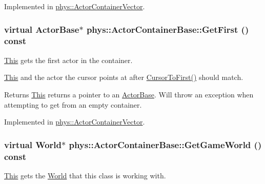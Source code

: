 Implemented in \hyperlink{classphys_1_1ActorContainerVector_ae18c29b30d840e0f4fc9b553dd5ca32c}{phys::ActorContainerVector}.

\hypertarget{classphys_1_1ActorContainerBase_ae703482d84a9c6726e28a8f26418b161}{
\subsubsection[{GetFirst}]{\setlength{\rightskip}{0pt plus 5cm}virtual {\bf ActorBase}$\ast$ phys::ActorContainerBase::GetFirst () const}}
\label{d1/d00/classphys_1_1ActorContainerBase_ae703482d84a9c6726e28a8f26418b161}


\hyperlink{structThis}{This} gets the first actor in the container. 

\hyperlink{structThis}{This} and the actor the cursor points at after \hyperlink{classphys_1_1ActorContainerBase_ab1a44758d7c17e70ff2e0f8de47424c3}{CursorToFirst()} should match. \begin{DoxyReturn}{Returns}
\hyperlink{structThis}{This} returns a pointer to an \hyperlink{classphys_1_1ActorBase}{ActorBase}. Will throw an exception when attempting to get from an empty container. 
\end{DoxyReturn}


Implemented in \hyperlink{classphys_1_1ActorContainerVector_a55ceecd017455f3185aa62798811e3c6}{phys::ActorContainerVector}.

\hypertarget{classphys_1_1ActorContainerBase_a479e6c7434f2611b0cfe6ca1fd4ebdd1}{
\subsubsection[{GetGameWorld}]{\setlength{\rightskip}{0pt plus 5cm}virtual {\bf World}$\ast$ phys::ActorContainerBase::GetGameWorld () const}}
\label{d1/d00/classphys_1_1ActorContainerBase_a479e6c7434f2611b0cfe6ca1fd4ebdd1}


\hyperlink{structThis}{This} gets the \hyperlink{classphys_1_1World}{World} that this class is working with. 

